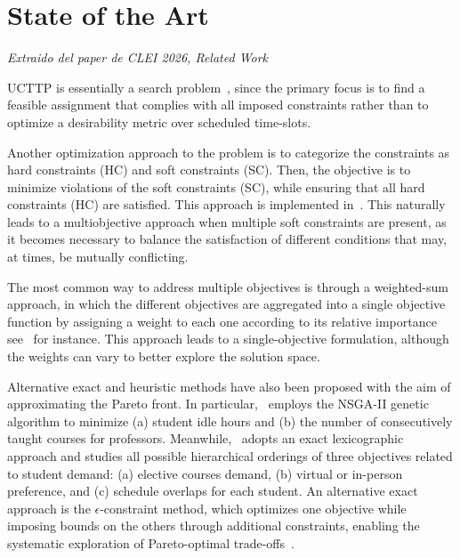 \section{State of the Art}




\textit{Extraido del paper de CLEI 2026, Related Work}

UCTTP is essentially a search problem~\cite{schaerf1999survey}, since the primary focus is to find a feasible assignment that complies with all imposed constraints rather than to optimize a desirability metric over scheduled time-slots.
    
Another optimization approach to the problem is to categorize the constraints as hard constraints (HC) and soft constraints (SC). Then, the objective is to minimize violations of the soft constraints (SC), while ensuring that all hard constraints (HC) are satisfied. This approach is implemented in~\cite{algethami2021}. This naturally leads to a multiobjective approach when multiple soft constraints are present, as it becomes necessary to balance the satisfaction of different conditions that may, at times, be mutually conflicting.



The most common way to address multiple objectives is through a weighted-sum approach, in which the different objectives are aggregated into a single objective function by assigning a weight to each one according to its relative importance see~\cite{hisyam2024implementation} for instance. This approach leads to a single-objective formulation, although the weights can vary to better explore the solution space.

Alternative exact and heuristic methods have also been proposed with the aim of approximating the Pareto front. In particular,~\cite{datta2007multi} employs the NSGA-II genetic algorithm to minimize (a) student idle hours and (b) the number of consecutively taught courses for professors. Meanwhile,~\cite{davison2025modelling} adopts an exact lexicographic approach and studies all possible hierarchical orderings of three objectives related to student demand: (a) elective courses demand, (b) virtual or in-person preference, and (c) schedule overlaps for each student. An alternative exact approach is the $\epsilon$-constraint method, which optimizes one objective while imposing bounds on the others through additional constraints, enabling the systematic exploration of Pareto-optimal trade-offs~\cite{mokhtari2021developing}.

